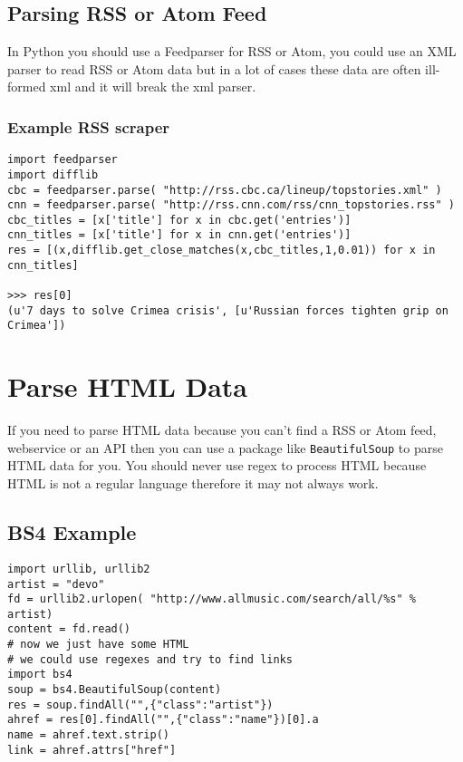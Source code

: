 \documentclass[../CMPUT-404-Notes.tex]{subfiles}
\begin{document}
\subsection{Parsing RSS or Atom Feed}
In Python you should use a Feedparser for RSS or Atom, you could use an XML parser to read RSS or Atom data but in a lot of cases these data are often ill-formed xml and it will break the xml parser.


\subsubsection{Example RSS scraper}
\begin{verbatim}
import feedparser
import difflib
cbc = feedparser.parse( "http://rss.cbc.ca/lineup/topstories.xml" ) 
cnn = feedparser.parse( "http://rss.cnn.com/rss/cnn_topstories.rss" )
cbc_titles = [x['title'] for x in cbc.get('entries')]
cnn_titles = [x['title'] for x in cnn.get('entries')]
res = [(x,difflib.get_close_matches(x,cbc_titles,1,0.01)) for x in cnn_titles]

>>> res[0]
(u'7 days to solve Crimea crisis', [u'Russian forces tighten grip on Crimea'])
\end{verbatim}


\section{Parse HTML Data}
If you need to parse HTML data because you can't find a RSS or Atom feed, webservice or an API then you can use a package like \texttt{BeautifulSoup} to parse HTML data for you.
You should never use regex to process HTML because HTML is not a regular language therefore it may not always work. 

\subsection{BS4 Example}
\begin{verbatim}
import urllib, urllib2
artist = "devo"
fd = urllib2.urlopen( "http://www.allmusic.com/search/all/%s" % artist)
content = fd.read()
# now we just have some HTML
# we could use regexes and try to find links
import bs4
soup = bs4.BeautifulSoup(content)
res = soup.findAll("",{"class":"artist"})
ahref = res[0].findAll("",{"class":"name"})[0].a
name = ahref.text.strip()
link = ahref.attrs["href"]
\end{verbatim}

\newpage
\end{document}
